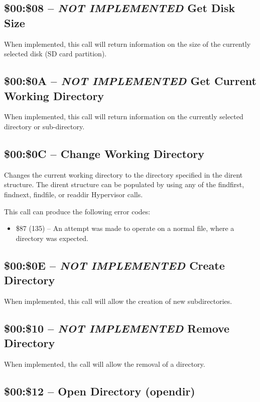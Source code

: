 \subsection{\$00:\$08 -- {\em NOT IMPLEMENTED} Get Disk Size}

When implemented, this call will return information on the size of the currently selected disk (SD card partition).

\subsection{\$00:\$0A -- {\em NOT IMPLEMENTED} Get Current Working Directory}

When implemented, this call will return information on the currently selected directory or sub-directory.

\subsection{\$00:\$0C -- Change Working Directory}

Changes the current working directory to the directory specified in the dirent structure. The dirent structure
can be populated by using any of the findfirst, findnext, findfile, or readdir Hypervisor calls.

This call can produce the following error codes:

\begin{itemize}
\item \$87 (135) -- An attempt was made to operate on a normal file, where a directory was expected.
\end{itemize}

\subsection{\$00:\$0E -- {\em NOT IMPLEMENTED} Create Directory}

When implemented, this call will allow the creation of new subdirectories.

\subsection{\$00:\$10 -- {\em NOT IMPLEMENTED} Remove Directory}

When implemented, ths call will allow the removal of a directory.

\subsection{\$00:\$12 -- Open Directory (opendir)}

